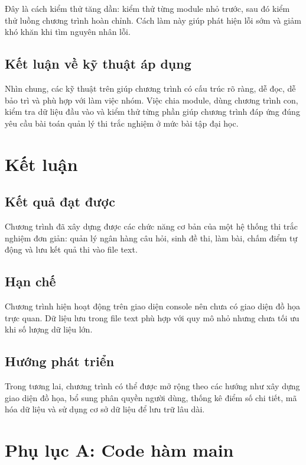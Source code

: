 \documentclass[12pt,a4paper]{report}
\begin{document}
Đây là cách kiểm thử tăng dần: kiểm thử từng module nhỏ trước, sau đó kiểm thử luồng chương trình hoàn chỉnh. Cách làm này giúp phát hiện lỗi sớm và giảm khó khăn khi tìm nguyên nhân lỗi.

\subsection{Kết luận về kỹ thuật áp dụng}

Nhìn chung, các kỹ thuật trên giúp chương trình có cấu trúc rõ ràng, dễ đọc, dễ bảo trì và phù hợp với làm việc nhóm. Việc chia module, dùng chương trình con, kiểm tra dữ liệu đầu vào và kiểm thử từng phần giúp chương trình đáp ứng đúng yêu cầu bài toán quản lý thi trắc nghiệm ở mức bài tập đại học.

\section{Kết luận}

\subsection{Kết quả đạt được}

Chương trình đã xây dựng được các chức năng cơ bản của một hệ thống thi trắc nghiệm đơn giản: quản lý ngân hàng câu hỏi, sinh đề thi, làm bài, chấm điểm tự động và lưu kết quả thi vào file text.

\subsection{Hạn chế}

Chương trình hiện hoạt động trên giao diện console nên chưa có giao diện đồ họa trực quan. Dữ liệu lưu trong file text phù hợp với quy mô nhỏ nhưng chưa tối ưu khi số lượng dữ liệu lớn.

\subsection{Hướng phát triển}

Trong tương lai, chương trình có thể được mở rộng theo các hướng như xây dựng giao diện đồ họa, bổ sung phân quyền người dùng, thống kê điểm số chi tiết, mã hóa dữ liệu và sử dụng cơ sở dữ liệu để lưu trữ lâu dài.

\newpage
\appendix

\section{Phụ lục A: Code hàm main}
\end{document}

